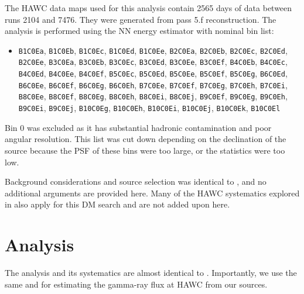 The HAWC data maps used for this analysis contain 2565 days of data between runs 2104 and 7476.
They were generated from pass 5.f reconstruction.
The analysis is performed using the NN energy estimator with nominal bin list:

\begin{itemize}
    \item[] \texttt{B1C0Ea}, \texttt{B1C0Eb}, \texttt{B1C0Ec}, \texttt{B1C0Ed}, \texttt{B1C0Ee}, \texttt{B2C0Ea}, \texttt{B2C0Eb}, \texttt{B2C0Ec}, \texttt{B2C0Ed}, \texttt{B2C0Ee}, \texttt{B3C0Ea}, \texttt{B3C0Eb}, \texttt{B3C0Ec}, \texttt{B3C0Ed}, \texttt{B3C0Ee}, \texttt{B3C0Ef}, \texttt{B4C0Eb}, \texttt{B4C0Ec}, \texttt{B4C0Ed}, \texttt{B4C0Ee}, \texttt{B4C0Ef}, \texttt{B5C0Ec}, \texttt{B5C0Ed}, \texttt{B5C0Ee}, \texttt{B5C0Ef}, \texttt{B5C0Eg}, \texttt{B6C0Ed}, \texttt{B6C0Ee}, \texttt{B6C0Ef}, \texttt{B6C0Eg}, \texttt{B6C0Eh}, \texttt{B7C0Ee}, \texttt{B7C0Ef}, \texttt{B7C0Eg}, \texttt{B7C0Eh}, \texttt{B7C0Ei}, \texttt{B8C0Ee}, \texttt{B8C0Ef}, \texttt{B8C0Eg}, \texttt{B8C0Eh}, \texttt{B8C0Ei}, \texttt{B8C0Ej}, \texttt{B9C0Ef}, \texttt{B9C0Eg}, \texttt{B9C0Eh}, \texttt{B9C0Ei}, \texttt{B9C0Ej}, \texttt{B10C0Eg}, \texttt{B10C0Eh}, \texttt{B10C0Ei}, \texttt{B10C0Ej}, \texttt{B10C0Ek}, \texttt{B10C0El}
\end{itemize}
Bin 0 was excluded as it has substantial hadronic contamination and poor angular resolution.
This list was cut down depending on the declination of the source because the PSF of these bins were too large, or the statistics were too low.

Background considerations and source selection was identical to , and no additional arguments are provided here.
Many of the HAWC systematics explored in  also apply for this DM search and are not added upon here.

\section{Analysis}\label{sec:mtd_analysis}

The analysis and its systematics are almost identical to .
Importantly, we use the same  and  for estimating the gamma-ray flux at HAWC from our sources.

